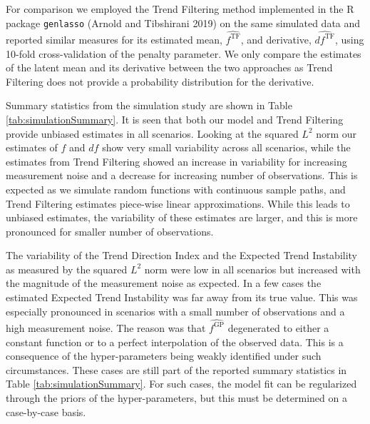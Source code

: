 \documentclass[
  11pt,
]{article}
\theoremstyle{nonumberplain}
\begin{document}
For comparison we employed the Trend Filtering method implemented in the
R package \texttt{genlasso} (Arnold and Tibshirani 2019) on the same
simulated data and reported similar measures for its estimated mean,
\(\widehat{f^\text{TF}}\), and derivative, \(\widehat{df^\text{TF}}\),
using 10-fold cross-validation of the penalty parameter. We only compare
the estimates of the latent mean and its derivative between the two
approaches as Trend Filtering does not provide a probability
distribution for the derivative.

Summary statistics from the simulation study are shown in Table
\ref{tab:simulationSummary}. It is seen that both our model and Trend
Filtering provide unbiased estimates in all scenarios. Looking at the
squared \(L^2\) norm our estimates of \(f\) and \(df\) show very small
variability across all scenarios, while the estimates from Trend
Filtering showed an increase in variability for increasing measurement
noise and a decrease for increasing number of observations. This is
expected as we simulate random functions with continuous sample paths,
and Trend Filtering estimates piece-wise linear approximations. While
this leads to unbiased estimates, the variability of these estimates are
larger, and this is more pronounced for smaller number of observations.

The variability of the Trend Direction Index and the Expected Trend
Instability as measured by the squared \(L^2\) norm were low in all
scenarios but increased with the magnitude of the measurement noise as
expected. In a few cases the estimated Expected Trend Instability was
far away from its true value. This was especially pronounced in
scenarios with a small number of observations and a high measurement
noise. The reason was that \(\widehat{f^\text{GP}}\) degenerated to
either a constant function or to a perfect interpolation of the observed
data. This is a consequence of the hyper-parameters being weakly
identified under such circumstances. These cases are still part of the
reported summary statistics in Table \ref{tab:simulationSummary}. For
such cases, the model fit can be regularized through the priors of the
hyper-parameters, but this must be determined on a case-by-case basis.
\end{document}
